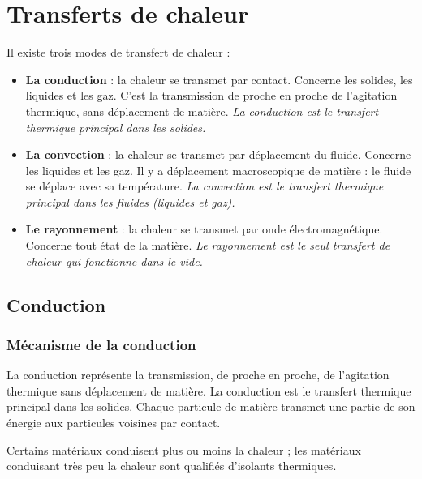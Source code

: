 \part{Transferts de chaleur}

Il existe trois modes de transfert de chaleur :
\begin{itemize}
  \item \textbf{La conduction} : la chaleur se transmet par contact.
  Concerne les solides, les liquides et les gaz. C'est la transmission de proche en proche de l'agitation thermique, sans déplacement de matière.
  \emph{La conduction est le transfert thermique principal dans les solides.}
  \item \textbf{La convection} : la chaleur se transmet par déplacement du fluide.
  Concerne les liquides et les gaz. Il y a déplacement macroscopique de matière : le fluide se déplace avec sa température.
  \emph{La convection est le transfert thermique principal dans les fluides (liquides et gaz).}
  \item \textbf{Le rayonnement} : la chaleur se transmet par onde électromagnétique.
  Concerne tout état de la matière.
  \emph{Le rayonnement est le seul transfert de chaleur qui fonctionne dans le vide.}
\end{itemize}


\chapter{Conduction}
\label{chap:conduction}

\section{Mécanisme de la conduction}
La conduction représente la transmission, de proche en proche, de l'agitation thermique sans déplacement de matière. La conduction est le transfert thermique principal dans les solides. Chaque particule de matière transmet une partie de son énergie aux particules voisines par contact.

Certains matériaux conduisent plus ou moins la chaleur ; les matériaux conduisant très peu la chaleur sont qualifiés d'isolants thermiques.

